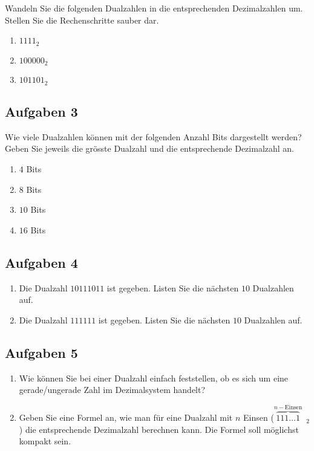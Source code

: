 Wandeln Sie die folgenden Dualzahlen in die entsprechenden Dezimalzahlen um. Stellen Sie die Rechenschritte sauber dar.

\begin{enumerate}
\item $1111_2$
\fillwithgrid{1.5in}
\item $100000_2$
\fillwithgrid{1.5in}
\item $101101_2$
\fillwithgrid{1.5in}
\end{enumerate}

\subsection{Aufgaben 3}
\label{subsection-dualcode-aufgaben-3}

Wie viele Dualzahlen können mit der folgenden Anzahl Bits dargestellt werden? Geben Sie jeweils die grösste Dualzahl und die entsprechende Dezimalzahl an.

\begin{enumerate}
\item $4$ Bits
\fillwithgrid{0.75in}
\item $8$ Bits
\fillwithgrid{0.75in}
\item $10$ Bits
\fillwithgrid{0.75in}
\item $16$ Bits
\fillwithgrid{0.75in}
\end{enumerate}

\subsection{Aufgaben 4}
\label{subsection-dualcode-aufgaben-4}

\begin{enumerate}
\item Die Dualzahl $10111011$ ist gegeben. Listen Sie die nächsten $10$ Dualzahlen auf.
\fillwithgrid{1.5in}
\item Die Dualzahl $111111$ ist gegeben. Listen Sie die nächsten $10$ Dualzahlen auf.
\fillwithgrid{1.5in}
\end{enumerate}

\subsection{Aufgaben 5}
\label{subsection-dualcode-aufgaben-5}

\begin{enumerate}
\item Wie können Sie bei einer Dualzahl einfach feststellen, ob es sich um eine gerade/ungerade Zahl im Dezimalsystem handelt?
\fillwithgrid{0.75in}
\item Geben Sie eine Formel an, wie man für eine Dualzahl mit $n$ Einsen ($\overbrace{111\dots1}^{n-\textrm{Einsen}}$~$_2$) die entsprechende Dezimalzahl berechnen kann. Die Formel soll möglichst kompakt sein.
\fillwithgrid{1.5in}
\end{enumerate}
